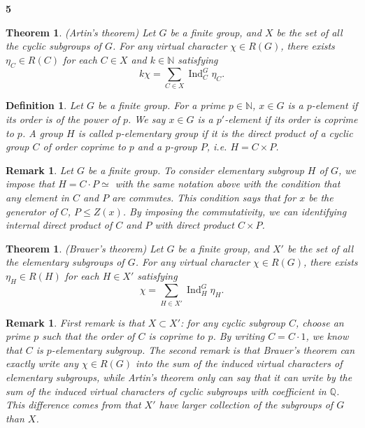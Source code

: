 \documentclass[a4paper, 12pt]{article}
\theoremstyle{Mydefinition}
\newtheorem{definition}[statement]{Definition}
\newtheorem{remark}[statement]{Remark}
\theoremstyle{Mytheorem}
\newtheorem{theorem}[statement]{Theorem}
\DeclareMathOperator{\Ind}{Ind}
\begin{document}
\noindent \textbf{5}
\begin{theorem}
(Artin's theorem) Let $G$ be a finite group, and $X$ be the set of all the cyclic subgroups of $G$. For any virtual character $\chi\in R(G)$, there exists $\eta_C\in R(C)$ for each $C\in X$ and $k\in \mathbb{N}$ satisfying
\begin{equation}
    k\chi = \sum_{C\in X}\Ind_C^G\eta_C.
\end{equation}
\end{theorem}
\begin{definition}
Let $G$ be a finite group. For a prime $p\in\mathbb{N}$, $x\in G$ is a $p$-element if its order is of the power of $p$. We say $x\in G$ is a $p'$-element if its order is coprime to $p$. A group $H$ is called $p$-elementary group if it is the direct product of a cyclic group $C$ of order coprime to $p$ and a $p$-group $P$, i.e. $H = C\times P$.
\end{definition}
\begin{remark}
Let $G$ be a finite group. To consider elementary subgroup $H$ of $G$, we impose that $H = C\cdot P\simeq$ with the same notation above with the condition that any element in $C$ and $P$ are commutes. This condition says that for $x$ be the generator of $C$, $P\leq Z(x)$. By imposing the commutativity, we can identifying internal direct product of $C$ and $P$ with direct product $C\times P$.
\end{remark}
\begin{theorem}\label{FIN:thm:2}
(Brauer's theorem) Let $G$ be a finite group, and $X'$ be the set of all the elementary subgroups of $G$. For any virtual character $\chi\in R(G)$, there exists $\eta_H\in R(H)$ for each $H\in X'$ satisfying
\begin{equation}
    \chi = \sum_{H\in X'}\Ind_H^G\eta_H.
\end{equation}
\end{theorem}
\begin{remark}
First remark is that $X\subset X'$: for any cyclic subgroup $C$, choose an prime $p$ such that the order of $C$ is coprime to $p$. By writing $C = C\cdot 1$, we know that $C$ is $p$-elementary subgroup. The second remark is that Brauer's theorem can exactly write any $\chi\in R(G)$ into the sum of the induced virtual characters of elementary subgroups, while Artin's theorem only can say that it can write by the sum of the induced virtual characters of cyclic subgroups with coefficient in $\mathbb{Q}$. This difference comes from that $X'$ have larger collection of the subgroups of $G$ than $X$.
\end{remark}
\end{document}

